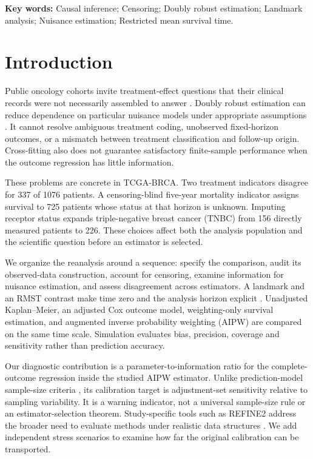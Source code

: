 \documentclass[12pt,letterpaper]{article}
\begin{document}
\noindent\textbf{Key words:} Causal inference; Censoring; Doubly robust estimation; Landmark analysis; Nuisance estimation; Restricted mean survival time.
\clearpage
{}

\section{Introduction}
Public oncology cohorts invite treatment-effect questions that their clinical records were not necessarily
assembled to answer \citep{tcga}. Doubly robust estimation can reduce dependence on particular nuisance models
under appropriate assumptions \citep{chernozhukov,zhang}. It cannot resolve ambiguous treatment coding,
unobserved fixed-horizon outcomes, or a mismatch between treatment classification and follow-up origin.
Cross-fitting also does not guarantee satisfactory finite-sample performance when the outcome regression
has little information.

These problems are concrete in TCGA-BRCA. Two treatment indicators disagree for 337 of
1076 patients. A censoring-blind five-year mortality indicator assigns survival to
725 patients whose status at that horizon is unknown. Imputing receptor status expands
triple-negative breast cancer (TNBC) from 156 directly measured patients to 226.
These choices affect both the analysis population and the scientific question before an estimator is selected.

We organize the reanalysis around a sequence: specify the comparison, audit its observed-data construction,
account for censoring, examine information for nuisance estimation, and assess disagreement across estimators.
A landmark and an RMST contrast make time zero and the analysis horizon explicit
\citep{dafni,hernantrial,conner}. Unadjusted Kaplan--Meier, an adjusted Cox outcome model,
weighting-only survival estimation, and augmented inverse probability weighting (AIPW) are compared on
the same time scale. Simulation evaluates bias, precision, coverage and sensitivity rather than prediction accuracy.

Our diagnostic contribution is a parameter-to-information ratio for the complete-outcome regression
inside the studied AIPW estimator. Unlike prediction-model sample-size criteria
\citep{peduzzi,riley,vansmeden}, its calibration target is adjustment-set sensitivity relative to
sampling variability. It is a warning indicator, not a universal sample-size rule or an estimator-selection
theorem. Study-specific tools such as REFINE2 address the broader need to evaluate methods under realistic
data structures \citep{refine}. We add independent stress scenarios to examine how far the original
calibration can be transported.
\end{document}
